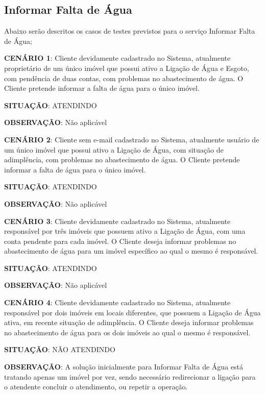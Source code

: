 \subsection{Informar Falta de Água}
Abaixo serão descritos os casos de testes previstos para o serviço Informar Falta de Água;
\begin{flushleft}
\begin{description}
	\item \textbf{CENÁRIO 1}: Cliente devidamente cadastrado no Sistema, atualmente proprietário de um único imóvel que possui ativo a Ligação de Água e Esgoto, com pendência de duas contas, com problemas no abastecimento de água. O Cliente pretende informar a falta de água para o único imóvel.
	\item \textbf{SITUAÇÃO}: ATENDINDO
	\item \textbf{OBSERVAÇÃO}: Não aplicável
\end{description}
\begin{description}
	\item \textbf{CENÁRIO 2}: Cliente sem e-mail cadastrado no Sistema, atualmente usuário de um único imóvel que possui ativo a Ligação de Água, com situação de adimplência, com problemas no abastecimento de água. O Cliente pretende informar a falta de água para o único imóvel.
	\item \textbf{SITUAÇÃO}: ATENDINDO
	\item \textbf{OBSERVAÇÃO}: Não aplicável
\end{description}
\begin{description}
	\item \textbf{CENÁRIO 3}: Cliente devidamente cadastrado no Sistema, atualmente responsável por três imóveis que possuem ativo a Ligação de Água, com uma conta pendente para cada imóvel. O Cliente deseja informar problemas no abastecimento de água para um imóvel específico ao qual o mesmo é responsável.
	\item \textbf{SITUAÇÃO}: ATENDINDO
	\item \textbf{OBSERVAÇÃO}: Não aplicável
\end{description}
\begin{description}
	\item \textbf{CENÁRIO 4}: Cliente devidamente cadastrado no Sistema, atualmente responsável por dois imóveis em locais diferentes, que possuem a Ligação de Água ativa, em recente situação de adimplência. O Cliente deseja informar problemas no abastecimento de água para os dois imóveis ao qual o mesmo é responsável.
	\item \textbf{SITUAÇÃO}: NÃO ATENDINDO
	\item \textbf{OBSERVAÇÃO}: A solução inicialmente para Informar Falta de Água está tratando apenas um imóvel por vez, sendo necessário redirecionar a ligação para o atendente concluir o atendimento, ou repetir a operação.
\end{description}
\end{flushleft}	

